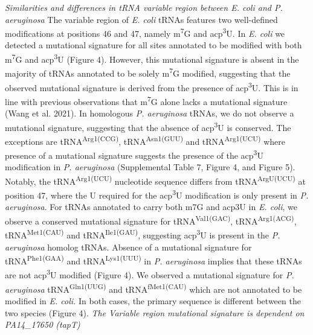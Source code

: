 \documentclass[times, twoside]{zHenriquesLab-StyleBioRxiv}
\begin{document}
\newline
\newline
\textit{Similarities and differences in tRNA variable region between E. coli and P. aeruginosa} \newline
The variable region of \textit{E. coli} tRNAs features two well-defined modifications at positions 46 and 47, namely m\textsuperscript{7}G and acp\textsuperscript{3}U. In \textit{E. coli} we detected a mutational signature for all sites annotated to be modified with both m\textsuperscript{7}G and acp\textsuperscript{3}U (Figure 4). However, this mutational signature is absent in the majority of tRNAs annotated to be solely m\textsuperscript{7}G modified, suggesting that the observed mutational signature is derived from the presence of acp\textsuperscript{3}U. This is in line with previous observations that m\textsuperscript{7}G alone lacks a mutational signature (Wang et al. 2021). In homologous \textit{P. aeruginosa} tRNAs, we do not observe a mutational signature, suggesting that the absence of acp\textsuperscript{3}U is conserved. The exceptions are tRNA\textsuperscript{Arg1(CCG)}, tRNA\textsuperscript{Asn1(GUU)} and tRNA\textsuperscript{Arg1(UCU)} where presence of a mutational signature suggests the presence of the acp\textsuperscript{3}U modification in \textit{P. aeruginosa} (Supplemental Table 7, Figure 4, and Figure 5). Notably, the tRNA\textsuperscript{Arg1(UCU)} nucleotide sequence differs from tRNA\textsuperscript{ArgU(UCU)} at position 47, where the U required for the acp\textsuperscript{3}U modification is only present in \textit{P. aeruginosa}. For tRNAs annotated to carry both m7G and acp3U in \textit{E. coli}, we observe a conserved mutational signature for tRNA\textsuperscript{Val1(GAC)}, tRNA\textsuperscript{Arg1(ACG)}, tRNA\textsuperscript{Met1(CAU)} and tRNA\textsuperscript{Ile1(GAU)}, suggesting acp\textsuperscript{3}U is present in the \textit{P. aeruginosa} homolog tRNAs. Absence of a mutational signature for tRNA\textsuperscript{Phe1(GAA)} and tRNA\textsuperscript{Lys1(UUU)} in \textit{P. aeruginosa} implies that these tRNAs are not acp\textsuperscript{3}U modified (Figure 4). We observed a mutational signature for \textit{P. aeruginosa} tRNA\textsuperscript{Gln1(UUG)} and tRNA\textsuperscript{fMet1(CAU)} which are not annotated to be modified in \textit{E. coli.} In both cases, the primary sequence is different between the two species (Figure 4).
\newline
\newline
\textit{The Variable region mutational signature is dependent on PA14\_17650 (tapT)} 
\end{document}
